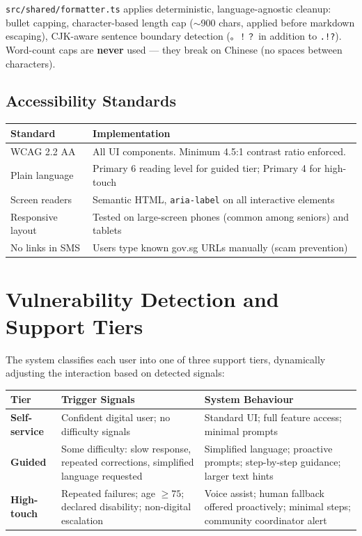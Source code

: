 \documentclass[12pt,a4paper]{article}
\begin{document}
\texttt{src/shared/formatter.ts} applies deterministic, language-agnostic cleanup:
bullet capping, character-based length cap ($\sim$900 chars, applied before markdown
escaping), CJK-aware sentence boundary detection (\texttt{。！？} in addition to
\texttt{.!?}). Word-count caps are \textbf{never} used — they break on Chinese
(no spaces between characters).

\subsection{Accessibility Standards}

\begin{tabular}{@{}lp{10cm}@{}}
\toprule
\textbf{Standard} & \textbf{Implementation} \\
\midrule
WCAG 2.2 AA       & All UI components. Minimum 4.5:1 contrast ratio enforced. \\
Plain language     & Primary 6 reading level for guided tier; Primary 4 for high-touch \\
Screen readers     & Semantic HTML, \texttt{aria-label} on all interactive elements \\
Responsive layout  & Tested on large-screen phones (common among seniors) and tablets \\
No links in SMS    & Users type known gov.sg URLs manually (scam prevention) \\
\bottomrule
\end{tabular}

\section{Vulnerability Detection and Support Tiers}
\label{sec:vulnerability}

The system classifies each user into one of three support tiers, dynamically
adjusting the interaction based on detected signals:

\begin{longtable}{@{}lp{5cm}p{5cm}@{}}
\toprule
\textbf{Tier} & \textbf{Trigger Signals} & \textbf{System Behaviour} \\
\midrule
\endhead
\textbf{Self-service}  & Confident digital user; no difficulty signals & Standard UI; full feature access; minimal prompts \\
\textbf{Guided}        & Some difficulty: slow response, repeated corrections, simplified language requested & Simplified language; proactive prompts; step-by-step guidance; larger text hints \\
\textbf{High-touch}    & Repeated failures; age $\geq75$; declared disability; non-digital escalation & Voice assist; human fallback offered proactively; minimal steps; community coordinator alert \\
\bottomrule
\end{longtable}
\end{document}
